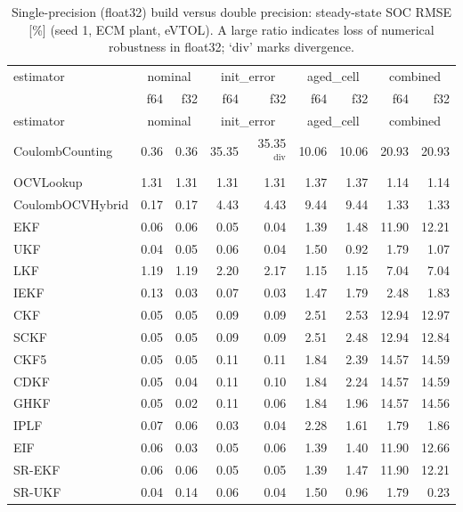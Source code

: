 \begin{longtable}{lrrrrrrrr}
\caption{Single-precision (float32) build versus double precision: steady-state SOC RMSE [\%] (seed 1, ECM plant, eVTOL). A large ratio indicates loss of numerical robustness in float32; `div' marks divergence.}\label{tab:float}\\
\toprule estimator & \multicolumn{2}{c}{nominal} & \multicolumn{2}{c}{init\_error} & \multicolumn{2}{c}{aged\_cell} & \multicolumn{2}{c}{combined} \\
 & f64 & f32 & f64 & f32 & f64 & f32 & f64 & f32 \\ \midrule\endfirsthead
\toprule estimator & \multicolumn{2}{c}{nominal} & \multicolumn{2}{c}{init\_error} & \multicolumn{2}{c}{aged\_cell} & \multicolumn{2}{c}{combined} \\ \midrule\endhead
CoulombCounting & 0.36 & 0.36 & 35.35 & 35.35$^{\mathrm{div}}$ & 10.06 & 10.06 & 20.93 & 20.93 \\
OCVLookup & 1.31 & 1.31 & 1.31 & 1.31 & 1.37 & 1.37 & 1.14 & 1.14 \\
CoulombOCVHybrid & 0.17 & 0.17 & 4.43 & 4.43 & 9.44 & 9.44 & 1.33 & 1.33 \\
EKF & 0.06 & 0.06 & 0.05 & 0.04 & 1.39 & 1.48 & 11.90 & 12.21 \\
UKF & 0.04 & 0.05 & 0.06 & 0.04 & 1.50 & 0.92 & 1.79 & 1.07 \\
LKF & 1.19 & 1.19 & 2.20 & 2.17 & 1.15 & 1.15 & 7.04 & 7.04 \\
IEKF & 0.13 & 0.03 & 0.07 & 0.03 & 1.47 & 1.79 & 2.48 & 1.83 \\
CKF & 0.05 & 0.05 & 0.09 & 0.09 & 2.51 & 2.53 & 12.94 & 12.97 \\
SCKF & 0.05 & 0.05 & 0.09 & 0.09 & 2.51 & 2.48 & 12.94 & 12.84 \\
CKF5 & 0.05 & 0.05 & 0.11 & 0.11 & 1.84 & 2.39 & 14.57 & 14.59 \\
CDKF & 0.05 & 0.04 & 0.11 & 0.10 & 1.84 & 2.24 & 14.57 & 14.59 \\
GHKF & 0.05 & 0.02 & 0.11 & 0.06 & 1.84 & 1.96 & 14.57 & 14.56 \\
IPLF & 0.07 & 0.06 & 0.03 & 0.04 & 2.28 & 1.61 & 1.79 & 1.86 \\
EIF & 0.06 & 0.03 & 0.05 & 0.06 & 1.39 & 1.40 & 11.90 & 12.66 \\
SR-EKF & 0.06 & 0.06 & 0.05 & 0.05 & 1.39 & 1.47 & 11.90 & 12.21 \\
SR-UKF & 0.04 & 0.14 & 0.06 & 0.04 & 1.50 & 0.96 & 1.79 & 0.23 \\

\end{longtable}
